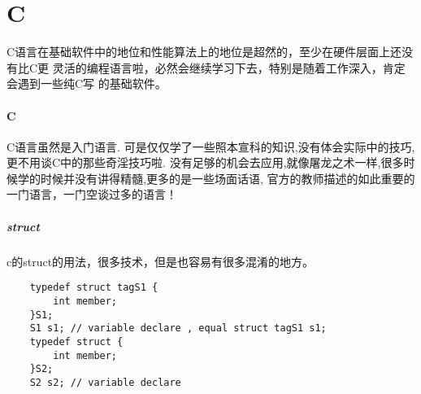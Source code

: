 \clearpage
\part{C}

C语言在基础软件中的地位和性能算法上的地位是超然的，至少在硬件层面上还没有比C更
灵活的编程语言啦，必然会继续学习下去，特别是随着工作深入，肯定会遇到一些纯C写
的基础软件。

\subsection{C}
C语言虽然是入门语言. 可是仅仅学了一些照本宣科的知识,没有体会实际中的技巧,更不用谈C中的那些奇淫技巧啦.
没有足够的机会去应用,就像屠龙之术一样,很多时候学的时候并没有讲得精髓,更多的是一些场面话语,
官方的教师描述的如此重要的一门语言，一门空谈过多的语言！

\subsubsection{struct}
c的struct的用法，很多技术，但是也容易有很多混淆的地方。
\begin{lstlisting}
    typedef struct tagS1 {
        int member;
    }S1;
    S1 s1; // variable declare , equal struct tagS1 s1;
    typedef struct {
        int member;
    }S2;
    S2 s2; // variable declare
\end{lstlisting}

